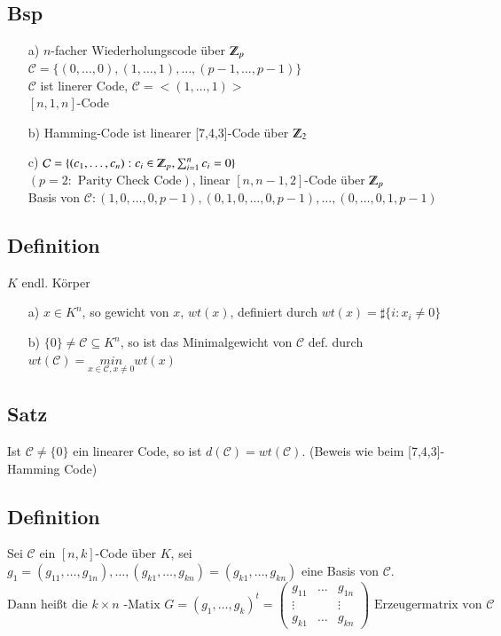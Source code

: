 \subsection{Bsp}
\begin{itemize}
	\item[a)] $n$-facher Wiederholungscode \"uber $\Z_p$\\
	$\mathcal{C}=\lbrace (0,\ldots,0),(1,\ldots,1),\ldots,(p-1,\ldots,p-1)\rbrace$\\ %
	$\mathcal{C}$ ist linerer Code, $\mathcal{C}=<(1,\ldots,1)>$\\
	$[n,1,n]$-Code
	\item[b)] Hamming-Code ist linearer [7,4,3]-Code \"uber $\Z_2$
	\item[c)] $\mathcal{C} = \lbrace (c_1,\ldots,c_n) : c_i \in \Z_p,\sum^n_{i=1}{c_i}=0 \rbrace$ \\
	$(p=2 : \text{ Parity Check Code})$, linear $[n,n-1,2]$-Code \"uber $\Z_p$\\
	Basis von $\mathcal{C}:(1,0,\ldots,0,p-1), (0,1,0,\ldots,0,p-1), \ldots, (0,\ldots,0,1,p-1)$
\end{itemize}
\subsection{Definition}
$K$ endl. K\"orper\\
\begin{itemize}
	\item[a)] $x \in K^n$, so gewicht von $x$, $wt(x)$, definiert durch $wt(x)=\sharp \lbrace i:x_i\neq0 \rbrace$
	\item[b)] $\lbrace 0 \rbrace \neq \mathcal{C} \subseteq K^n$, so ist das Minimalgewicht von $\mathcal{C}$ def. durch $wt(\mathcal{C})=\underset{x\in\mathcal{C}, x\neq 0}{min} wt(x)$
\end{itemize}

\subsection{Satz}
Ist $\mathcal{C} \neq \lbrace 0 \rbrace$ ein linearer Code, so ist $d(\mathcal{C})=wt(\mathcal{C})$. (Beweis wie beim [7,4,3]-Hamming Code)

\subsection{Definition}
Sei $\mathcal{C}$ ein $[n,k]$-Code \"uber $K$, sei $g_1=(g_{11},\ldots,g_{1n}),\ldots,(g_{k1},\ldots,g_{kn})=(g_{k1},\ldots,g_{kn})$ eine Basis von $\mathcal{C}$.
\[
\text{Dann hei\ss t die } k\times n\text{ -Matix } G=(g_1,\ldots,g_k)^t=\begin{pmatrix}
	g_{11}&\ldots&g_{1n}\\
	\vdots&&\vdots\\
	g_{k1}&\ldots&g_{kn}
\end{pmatrix}
\text{ Erzeugermatrix von } \mathcal{C}
\]
